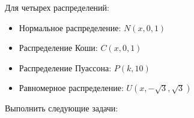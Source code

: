 Для четырех распределений:
\begin{itemize}
	\item Нормальное распределение: $N(x, 0, 1)$
	\item Распределение Коши: $C(x, 0, 1)$
	\item Распределение Пуассона: $P(k, 10)$
	\item Равномерное распределение: $U(x, -\sqrt{3}, \sqrt{3})$
\end{itemize}
Выполнить следующие задачи: